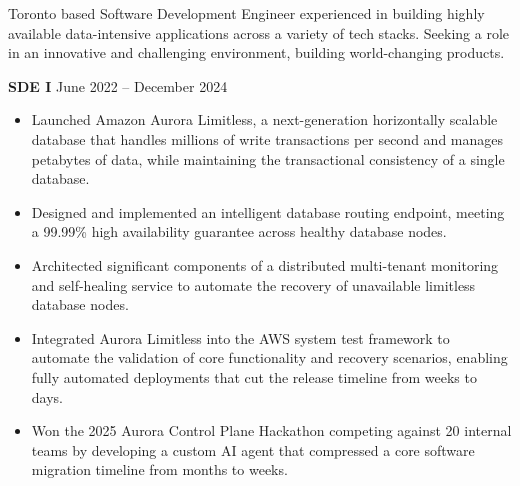 \documentclass[10pt,a4paper]{altacv}
\begin{document}

\begin{fullwidth}
    \makecvheader
    Toronto based Software Development Engineer experienced in building highly available data-intensive applications across a variety of tech stacks. Seeking a role in an innovative and challenging environment, building world-changing products.
\end{fullwidth}


\vspace{-0.25em}
\textbf{\color{accent}SDE I}
\hfill\small\faCalendar\hspace{0.5em}June 2022 -- December 2024
\normalsize
\medskip
\begin{itemize}
    \item Launched Amazon Aurora Limitless, a next-generation horizontally scalable database that handles millions of write transactions per second and manages petabytes of data, while maintaining the transactional consistency of a single database.
    \item Designed and implemented an intelligent database routing endpoint, meeting a 99.99\% high availability guarantee across healthy database nodes.
    \item Architected significant components of a distributed multi-tenant monitoring and self-healing service to automate the recovery of unavailable limitless database nodes.
    \item Integrated Aurora Limitless into the AWS system test framework to automate the validation of core functionality and recovery scenarios, enabling fully automated deployments that cut the release timeline from weeks to days.
    \item Won the 2025 Aurora Control Plane Hackathon competing against 20 internal teams by developing a custom AI agent that compressed a core software migration timeline from months to weeks.
\end{itemize}
\end{document}
